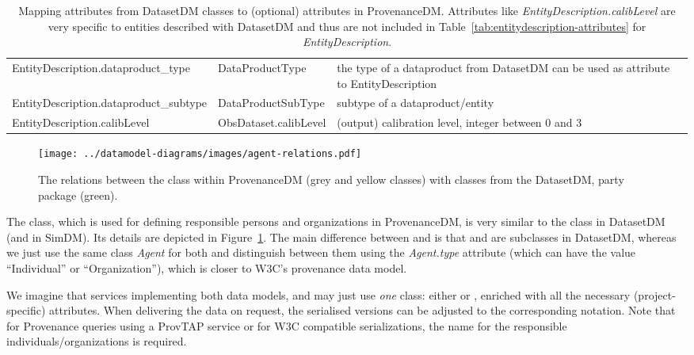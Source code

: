 \begin{table}[h]
\begin{tabulary}{1.0\textwidth}{@{}Llp{5cm}@{}}
EntityDescription.dataproduct\_type & DataProductType & the type of a dataproduct from DatasetDM can be used as attribute to EntityDescription\\
EntityDescription.dataproduct\_subtype & DataProductSubType & subtype of a \mbox{dataproduct}/entity\\
EntityDescription.calibLevel & ObsDataset.calibLevel & (output) calibration level, integer between 0 and 3\\
\bottomrule
\end{tabulary}
\caption{Mapping attributes from DatasetDM classes to (optional) attributes in ProvenanceDM. Attributes like \emph{EntityDescription.calibLevel} are very specific to entities described with DatasetDM and thus are not included in Table~\ref{tab:entitydescription-attributes} for \emph{EntityDescription}. }
\label{tab:datasetmapping}
\end{table}


\begin{figure}[h]
\centering
\texttt{[image: ../datamodel-diagrams/images/agent-relations.pdf]}
\caption{The relations between the  class within ProvenanceDM 
(grey and yellow classes) with classes from the DatasetDM, party package (green).}
\label{fig:agent-relations}
\end{figure}

The  class, which is used for defining responsible persons and 
organizations in ProvenanceDM, is very similar to the  class in DatasetDM (and in SimDM). Its details are depicted in Figure~\ref{fig:agent-relations}.
The main difference between  and  is that  and  are subclasses in DatasetDM, whereas we just use the same class \emph{Agent} for both and distinguish between them using the \emph{Agent.type} attribute (which can have the value ``Individual'' or ``Organization''), which is closer to W3C's provenance data model.


We imagine that services implementing both data models,  and  may just use \emph{one} class: either  or , enriched with all the necessary (project-specific) attributes. When delivering the data on request, the serialised versions can be adjusted to the corresponding notation.
Note that for Provenance queries using a ProvTAP service or for W3C compatible serializations, the name  for the responsible individuals/organizations is required.



